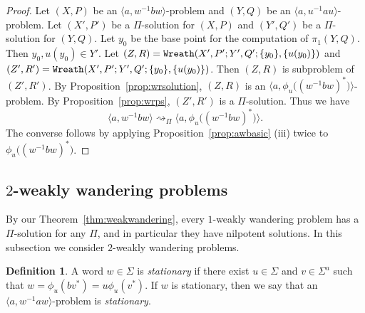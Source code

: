 \documentclass[10pt,a4paper]{amsart}
\theoremstyle{definition}
\newtheorem{definition}[theorem]{Definition}
\theoremstyle{definition}
\numberwithin{equation}{section}
\begin{document}
\begin{proof} Let $(X, P)$ be an $\langle a, w^{-1}bw\rangle$-problem and $(Y, Q)$ be an $\langle a, u^{-1}au\rangle$-problem. Let $(X', P')$ be a $\Pi$-solution for $(X, P)$ and $(Y', Q')$ be a $\Pi$-solution for $(Y, Q)$. Let $y_0$ be the base point for the computation of $\pi_1(Y, Q)$. Then $y_0, u(y_0)\in Y'$. Let $(Z, R)=\mbox{\tt Wreath}(X', P'; Y', Q'; \{y_0\}, \{u(y_0)\})$ and $(Z', R')=\mbox{\tt Wreath}(X', P'; Y', Q'; \{y_0\}, \{u(y_0)\})$. Then $(Z, R)$ is subproblem of $(Z', R')$. By Proposition~\ref{prop:wrsolution}, $(Z, R)$ is an $\big\langle a, \phi_u\big((w^{-1}bw)^*\big)\big\rangle$-problem. By Proposition~\ref{prop:wrps}, $(Z', R')$ is a $\Pi$-solution. Thus we have
$$ \langle a, w^{-1}bw\rangle \rightsquigarrow_{\Pi} \big\langle a, \phi_u\big((w^{-1}bw)^*\big)\big\rangle.$$
The converse follows by applying Proposition~\ref{prop:awbasic} (iii) twice to $\phi_u\big((w^{-1}bw)^*\big)$.
\end{proof}











































\subsection{$2$-weakly wandering problems\label{subsec:2ww}}

By our Theorem~\ref{thm:weakwandering}, every $1$-weakly wandering problem has a $\Pi$-solution for any $\Pi$, and in particular they have nilpotent solutions. In this subsection we consider $2$-weakly wandering problems. 

\begin{definition} A word $w\in \Sigma$ is {\em stationary} if there exist $u\in \Sigma$ and $v\in \Sigma^a$ such that $w=\phi_u(bv^*)=u\phi_u(v^*)$. If $w$ is stationary, then we say that an $\langle a, w^{-1}aw\rangle$-problem is {\em stationary}.
\end{definition}
\end{document}
